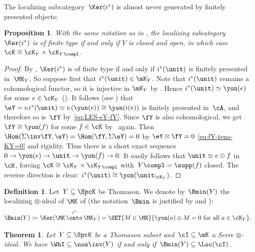 \documentclass[11pt]{amsart}
\numberwithin{equation}{section} %
\theoremstyle{plain}
\newtheorem{thm}[equation]{Theorem}
\newtheorem{prop}[equation]{Proposition}
\theoremstyle{definition}
\newtheorem{dfn}[equation]{Definition}
\theoremstyle{remark}
\begin{document}
%
The localizing subcategory~$\Ker(i^*)$ is almost never generated by finitely presented objects:
%
\begin{prop}
\label{prop:Bmin-not-finite-type}%
With the same notation as in , the localizing subcategory~$\Ker(i^*)$ is of finite type if and only if $Y$ is closed and open, in which case~$\cK \cong \cK_Y \times \cK_{Y\compl}$.
\end{prop}
%
\begin{proof}
By , $\Ker(i^*)$ is of finite type if and only if $i^*(\unit)$ is finitely presented in~$\MK_Y$. So suppose first that $i^*(\unit) \in \mK_Y$. Note that $i^*(\unit)$ remains a cohomological functor, so it is injective in $\mK_Y$ by \cite[Lemma 2.7]{Krause00}. Hence $i^*(\unit)\simeq \yon(e)$ for some $e \in \cK_Y$ (). It follows (see ) that $\eY=i_! i^*(\unit) \simeq i_!(\yon(e)) \cong \yon(i(e))$ is finitely presented in~$\cA$, and therefore so is~$\fY$ by~\eqref{eq:LES-eY-fY}. Since $\fY$ is also cohomological, we get $\fY \cong \yon(f)$ for some $f \in \cK$ by~\cite[Lemma 2.7]{Krause00} again.
Then $\Hom(\Sigma\inv \fY, \eY) = \Hom(\fY, \Sigma \eY) = 0$ by $\eY\otimes\fY=0$ \eqref{eq:fY-tens-KY=0} and rigidity. Thus there is a short exact sequence $0 \to \yon(e) \to \unit \to \yon(f) \to 0.$ It easily follows that $\unit \simeq e \oplus f$ in~$\cK$, forcing $\cK \cong \cK_Y \times \cK_{Y\compl}$ with~$Y\compl=\supp(f)$ closed.
The reverse direction is clear: $i^*(\unit)\cong \yon(\unit_{\cK_Y})$.
\end{proof}

%
\begin{dfn}
\label{dfn:Bmin}%
Let~$Y\subseteq\SpcK$ be Thomason. We denote by~$\Bmin(Y)$ the localizing $\otimes$-ideal of $\MK$ of 
(the notation~$\Bmin$ is justified by  and ):
%
\begin{equation*}
\Bmin(Y)\coloneq\Ker(\MK\overset{i^*}{\,\onto\,} \MK_Y)
= \SET{ M \in \MK}{\yon(a) \otimes M = 0 \textrm{ for all }a\in \cK_Y}.
\end{equation*}
%
\end{dfn}

%
\begin{thm}
\label{thm:Bmin}%
Let~$Y\subseteq\SpcK$ be a Thomason subset and~$\cI\subseteq \mK$ a Serre $\otimes$-ideal.
We have $\WhI\subseteq \nos\inv(Y)$ if and only if~$\Bmin(Y)\subseteq \Loc(\cI)$.
\end{thm}
\end{document}
